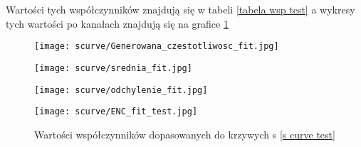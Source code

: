 Wartości tych współczynników znajdują się w tabeli \ref{tabela wsp test} a wykresy tych wartości po kanałach znajdują się na grafice \ref{test fit wsp wyk} 

\begin{figure}
        \begin{multicols}{2}
                \texttt{[image: scurve/Generowana\_czestotliwosc\_fit.jpg]} \par
                \texttt{[image: scurve/srednia\_fit.jpg]} \par       
        \end{multicols} \hfill
        \begin{multicols}{2}
                \texttt{[image: scurve/odchylenie\_fit.jpg]} \par
                \texttt{[image: scurve/ENC\_fit\_test.jpg]} \par
        \end{multicols}
        \caption{Wartości współczynników dopasowanych do krzywych s \ref{s curve test}}
        \label{test fit wsp wyk}
\end{figure}


